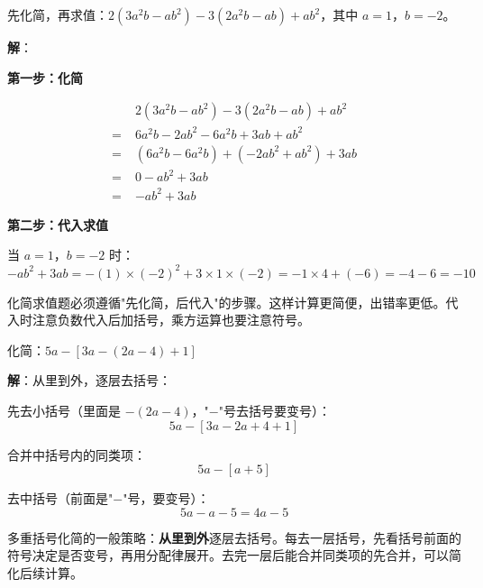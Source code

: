 \documentclass[12pt, a4paper]{ctexart}
\begin{document}
\vspace{6pt}

\begin{examplebox}[【例题6】化简求值]
先化简，再求值：$2(3a^2b - ab^2) - 3(2a^2b - ab) + ab^2$，其中 $a = 1$，$b = -2$。
\end{examplebox}

\textbf{解}：

\textbf{第一步：化简}

\begin{align*}
&2(3a^2b - ab^2) - 3(2a^2b - ab) + ab^2 \\
=\;& 6a^2b - 2ab^2 - 6a^2b + 3ab + ab^2 \\
=\;& (6a^2b - 6a^2b) + (-2ab^2 + ab^2) + 3ab \\
=\;& 0 - ab^2 + 3ab \\
=\;& -ab^2 + 3ab
\end{align*}

\textbf{第二步：代入求值}

当 $a = 1$，$b = -2$ 时：
\[
-ab^2 + 3ab = -(1) \times (-2)^2 + 3 \times 1 \times (-2) = -1 \times 4 + (-6) = -4 - 6 = -10
\]

\begin{tipbox}[方法总结]
化简求值题必须遵循"先化简，后代入"的步骤。这样计算更简便，出错率更低。代入时注意负数代入后加括号，乘方运算也要注意符号。
\end{tipbox}

\vspace{6pt}

\begin{examplebox}[【例题7】含多重括号的化简]
化简：$5a - [3a - (2a - 4) + 1]$
\end{examplebox}

\textbf{解}：从里到外，逐层去括号：

先去小括号（里面是 $-(2a-4)$，"$-$"号去括号要变号）：
\[
5a - [3a - 2a + 4 + 1]
\]

合并中括号内的同类项：
\[
5a - [a + 5]
\]

去中括号（前面是"$-$"号，要变号）：
\[
5a - a - 5 = 4a - 5
\]

\begin{tipbox}[方法总结]
多重括号化简的一般策略：\textbf{从里到外}逐层去括号。每去一层括号，先看括号前面的符号决定是否变号，再用分配律展开。去完一层后能合并同类项的先合并，可以简化后续计算。
\end{tipbox}


\end{document}
